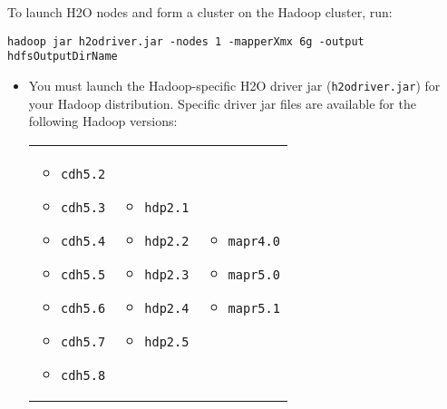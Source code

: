 {{To launch H2O nodes and form a cluster on the Hadoop cluster, run:

\begin{lstlisting}[style=R]
hadoop jar h2odriver.jar -nodes 1 -mapperXmx 6g -output hdfsOutputDirName

\end{lstlisting}

\begin{itemize}
\item You must launch the Hadoop-specific H2O driver jar (\texttt{h2odriver.jar}) for your Hadoop distribution. Specific driver jar files are available for the following Hadoop versions:

\begin{frame}%

\begin{tabular}{p{3cm}p{3cm}p{3cm}}

\begin{itemize}
     \item \texttt{cdh5.2}
     \item \texttt{cdh5.3}
     \item \texttt{cdh5.4}
     \item \texttt{cdh5.5}
     \item \texttt{cdh5.6}
     \item \texttt{cdh5.7}
     \item \texttt{cdh5.8}
  \end{itemize} &

\begin{itemize}
  \item \texttt{hdp2.1}
  \item  \texttt{hdp2.2}
  \item  \texttt{hdp2.3}
  \item  \texttt{hdp2.4}
  \item  \texttt{hdp2.5}
\end{itemize} &

\begin{itemize}
  \item  \texttt{mapr4.0}
  \item  \texttt{mapr5.0}
  \item  \texttt{mapr5.1}
\end{itemize}\\

\end{tabular}

\end{frame}


\end{itemize}}}
